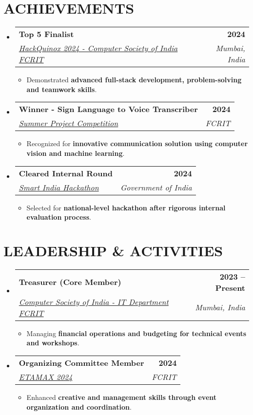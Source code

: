 \documentclass[a4paper,11pt]{article}
\makeatletter
\newcommand{\resumeItem}[1]{\item\small{{#1 \vspace{-2pt}}}}
\newcommand{\resumeSubheading}[4]{
  \vspace{-2pt}\item
  \begin{tabular*}{1.0\textwidth}[t]{l@{\extracolsep{\fill}}r}
    \textbf{\large#1} & \textbf{\small #2} \\
    \textit{\large#3} & \textit{\small #4} \\
  \end{tabular*}\vspace{-7pt}
}
\newcommand{\resumeSubHeadingListStart}{\begin{itemize}[leftmargin=0.0in, label={}]}
\newcommand{\resumeSubHeadingListEnd}{\end{itemize}}
\newcommand{\resumeItemListStart}{\begin{itemize}}
\newcommand{\resumeItemListEnd}{\end{itemize}\vspace{-5pt}}
\makeatother
\begin{document}
\section{ACHIEVEMENTS}
\resumeSubHeadingListStart
  \resumeSubheading
    {Top 5 Finalist}{2024}
    {\underline{HackQuinox 2024 - Computer Society of India FCRIT}}{Mumbai, India}
    \resumeItemListStart
      \resumeItem{\normalsize{Demonstrated \textbf{advanced full-stack development, problem-solving and teamwork skills}.}}
    \resumeItemListEnd

  \resumeSubheading
    {Winner - Sign Language to Voice Transcriber}{2024}
    {\underline{Summer Project Competition}}{FCRIT}
    \resumeItemListStart
      \resumeItem{\normalsize{Recognized for \textbf{innovative communication solution using computer vision and machine learning}.}}
    \resumeItemListEnd

  \resumeSubheading
    {Cleared Internal Round}{2024}
    {\underline{Smart India Hackathon}}{Government of India}
    \resumeItemListStart
      \resumeItem{\normalsize{Selected for \textbf{national-level hackathon after rigorous internal evaluation process}.}}
    \resumeItemListEnd
\resumeSubHeadingListEnd

\section{LEADERSHIP \& ACTIVITIES}
\resumeSubHeadingListStart
  \resumeSubheading
    {Treasurer (Core Member)}{2023 -- Present}
    {\underline{Computer Society of India - IT Department FCRIT}}{Mumbai, India}
    \resumeItemListStart
      \resumeItem{\normalsize{Managing \textbf{financial operations and budgeting for technical events and workshops}.}}
    \resumeItemListEnd

  \resumeSubheading
    {Organizing Committee Member}{2024}
    {\underline{ETAMAX 2024}}{FCRIT}
    \resumeItemListStart
      \resumeItem{\normalsize{Enhanced \textbf{creative and management skills through event organization and coordination}.}}
    \resumeItemListEnd
\resumeSubHeadingListEnd
\end{document}
